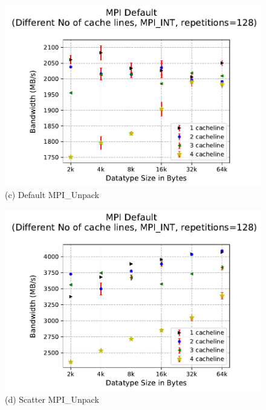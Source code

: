 \documentclass[conference]{IEEEtran}
\begin{document}
\begin{figure}[h]
\begin{minipage}{.45\textwidth}
  \centering
  \includegraphics[trim={0 0.7cm 0 1.5cm},clip,width=\linewidth]{to_self_avx_scatter_20tests__default_cachelines.pdf}
  {(c) Default MPI\_Unpack}
\end{minipage}%
\begin{minipage}{.45\textwidth}
  \centering
  \includegraphics[trim={0 0.7cm 0 1.5cm},clip,width=\linewidth]{to_self_avx_scatter_20tests_cachelines.pdf}
  {(d) Scatter MPI\_Unpack}
\end{minipage}
\label{fig:cachelines}
\end{figure}
\end{document}
